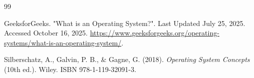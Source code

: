 \begin{thebibliography}{99}
\singlespace \normalsize



  GeeksforGeeks.
  "What is an Operating System?".
  Last Updated July 25, 2025.
  Accessed October 16, 2025.
  \url{https://www.geeksforgeeks.org/operating-systems/what-is-an-operating-system/}.

Silberschatz, A., Galvin, P. B., \& Gagne, G. (2018).
\textit{Operating System Concepts} (10th ed.).
Wiley.
ISBN 978-1-119-32091-3.

\end{thebibliography}

